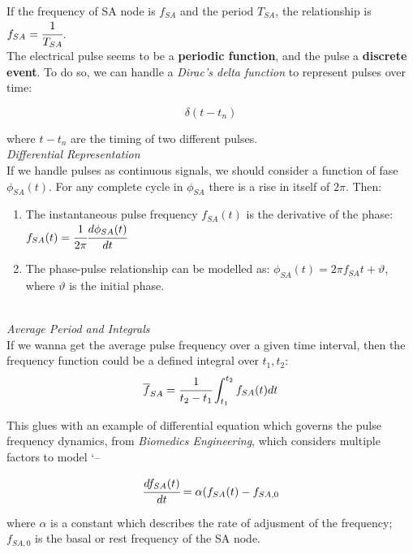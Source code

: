 If the frequency of SA node is $f_{SA}$ and the period $T_{SA}$, the relationship is $f_{SA} = \cfrac{1}{T_{SA}}$. \\

The electrical pulse seems to be a \textbf{periodic function}, and the pulse a \textbf{discrete event}. To do so, we can handle a \emph{Dirac's delta function} to represent pulses over time:

\begin{equation}
    \delta(t - t_n)
\end{equation}

where $t - t_n$ are the timing of two different pulses. \\

\emph{Differential Representation} \\

If we handle pulses as continuous signals, we should consider a function of fase $\phi_{SA} (t)$. For any complete cycle in $\phi_{SA}$ there is a rise in itself of $2 \pi$. Then: \\

\begin{enumerate}
    \item The instantaneous pulse frequency $f_{SA} (t)$ is the derivative of the phase: $f_{SA} (t) = \cfrac{1}{2 \pi} \cfrac{d \phi_{SA}(t)}{dt}$ \\
    \item The phase-pulse relationship can be modelled as: $\phi_{SA} (t) = 2\pi f_{SA}t + \vartheta$, where $\vartheta$ is the initial phase.
\end{enumerate} \\


\emph{Average Period and Integrals} \\

If we wanna get the average pulse frequency over a given time interval, then the frequency function could be a defined integral over $t_1,t_2$: \\

\begin{equation}
    \overline {f}_{SA} = \cfrac{1}{t_2 - t_1} \int_{t_1}^{t_2} f_{SA} (t) dt
\end{equation}

This glues with an example of differential equation which governs the pulse frequency dynamics, from \emph{Biomedics Engineering}, which considers multiple factors to model `--

\begin{equation}
    \cfrac{d f_{SA} (t)}{dt} = \alpha(f_{SA}(t) - f_{SA,0}
\end{equation}

where $\alpha$ is a constant which describes the rate of adjusment of the frequency; $f_{SA,0}$ is the basal or rest frequency of the SA node.
